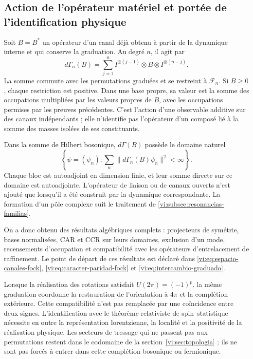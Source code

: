 \subsection{Action de l’opérateur matériel et portée de l’identification physique}
\label{vi:subsec:fock-alcance}

Soit \(B=B^*\) un opérateur d’un canal déjà obtenu à partir de la
dynamique interne et qui conserve la graduation. Au degré \(n\),
il agit par
\[
 d\Gamma_n(B)=\sum_{j=1}^n
 I^{\otimes(j-1)}\otimes B\otimes I^{\otimes(n-j)}.
\]
La somme commute avec les permutations graduées et se restreint
à \(\mathcal F_n\). Si \(B\ge0\), chaque restriction est positive.
Dans une base propre, sa valeur est la somme des occupations
multipliées par les valeurs propres de \(B\), avec les occupations
permises par les preuves précédentes. C’est l’action
d’une observable additive sur des canaux indépendants ;
elle n’identifie pas l’opérateur d’un composé lié à la
somme des masses isolées de ses constituants.

Dans la somme de Hilbert bosonique, \(d\Gamma(B)\) possède le
domaine naturel
\[
 \left\{\psi=(\psi_n):
 \sum_n\|d\Gamma_n(B)\psi_n\|^2<\infty\right\}.
\]
Chaque bloc est autoadjoint en dimension finie, et leur somme
directe sur ce domaine est autoadjointe. L’opérateur de liaison
ou de canaux ouverts n’est ajouté que lorsqu’il a été construit
par la dynamique correspondante. La formation d’un pôle
complexe suit le traitement de
\ref{vi:subsec:resonancias-familias}.

On a donc obtenu des résultats algébriques complets :
projecteurs de symétrie, bases normalisées, CAR et CCR sur
leurs domaines, exclusion d’un mode, recensements d’occupation et
compatibilité avec les opérateurs d’entrelacement de raffinement. Le point
de départ de ces résultats est déclaré dans
\eqref{vi:eq:espacio-canales-fock},
\eqref{vi:eq:caracter-paridad-fock} et
\eqref{vi:eq:intercambio-graduado}.

Lorsque la réalisation des rotations satisfait
\(U(2\pi)=(-1)^p\), la même graduation coordonne la
restauration de l’orientation à \(4\pi\) et la complétion
extérieure. Cette compatibilité n’est pas remplacée par une
coïncidence entre deux signes. L’identification avec le
théorème relativiste de spin--statistique nécessite en outre
la représentation lorentzienne, la localité et la positivité
de la réalisation physique. Les secteurs de tressage qui ne
passent pas aux permutations restent dans le codomaine de
la section~\ref{vi:sec:topologia} ; ils ne sont pas forcés à entrer
dans cette complétion bosonique ou fermionique.
